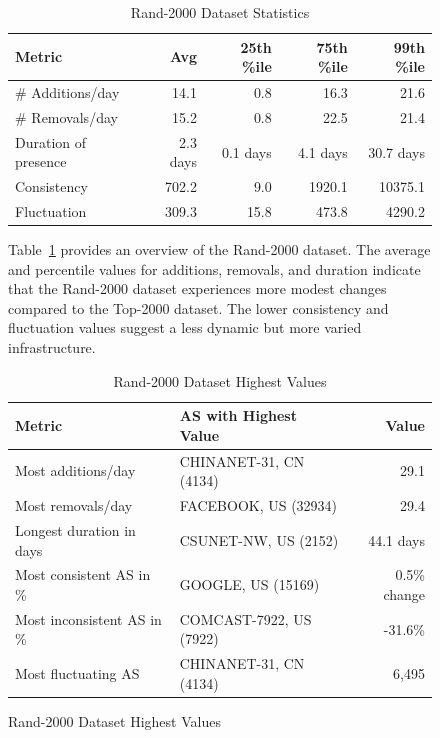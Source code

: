 \documentclass[12pt]{cwru_thesis}
\begin{document}
\begin{figure}[h!]
\begin{table}[h!]
    \centering
    \begin{tabular}{|l|r|r|r|r|}
        \hline
        \textbf{Metric} & \textbf{Avg} & \textbf{25th \%ile} & \textbf{75th \%ile} & \textbf{99th \%ile} \\
        \hline
        \# Additions/day & 14.1 & 0.8 & 16.3 & 21.6 \\
        \hline
        \# Removals/day & 15.2 & 0.8 & 22.5 & 21.4 \\
        \hline
        Duration of presence & 2.3 days & 0.1 days & 4.1 days & 30.7 days \\
        \hline
        Consistency & 702.2 & 9.0 & 1920.1 & 10375.1 \\
        \hline
        Fluctuation & 309.3 & 15.8 & 473.8 & 4290.2 \\
        \hline
    \end{tabular}
    \caption{Rand-2000 Dataset Statistics}
    \label{tab:rand-2000-stats}
\end{table}

Table~\ref{tab:rand-2000-stats} provides an overview of the Rand-2000 dataset. The average and percentile values for additions, removals, and duration indicate that the Rand-2000 dataset experiences more modest changes compared to the Top-2000 dataset. The lower consistency and fluctuation values suggest a less dynamic but more varied infrastructure.

\begin{table}[h!]
    \centering
    \begin{tabular}{|l|l|r|}
        \hline
        \textbf{Metric} & \textbf{AS with Highest Value} & \textbf{Value} \\
        \hline
        Most additions/day & CHINANET-31, CN (4134) & 29.1 \\
        \hline
        Most removals/day & FACEBOOK, US (32934) & 29.4 \\
        \hline
        Longest duration in days & CSUNET-NW, US (2152)& 44.1 days \\
        \hline
        Most consistent AS in \% & GOOGLE, US (15169)& 0.5\% change \\
        \hline
        Most inconsistent AS in \% & COMCAST-7922, US (7922) & -31.6\% \\
        \hline
        Most fluctuating AS & CHINANET-31, CN (4134) & 6,495 \\
        \hline
    \end{tabular}
    \caption{Rand-2000 Dataset Highest Values}
    \label{tab:rand-2000-highest}
\end{table}


\end{figure}
\end{document}
